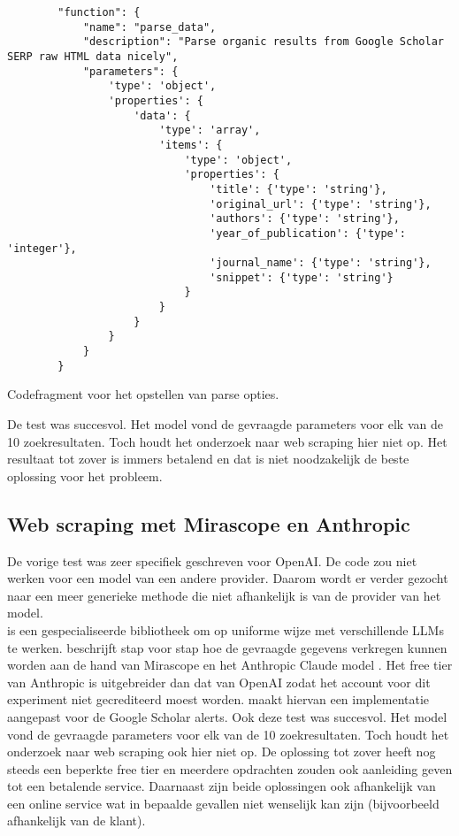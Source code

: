 \begin{listing}
    \begin{verbatim}
        "function": {
            "name": "parse_data",
            "description": "Parse organic results from Google Scholar SERP raw HTML data nicely",
            "parameters": {
                'type': 'object',
                'properties': {
                    'data': {
                        'type': 'array',
                        'items': {
                            'type': 'object',
                            'properties': {
                                'title': {'type': 'string'},
                                'original_url': {'type': 'string'},
                                'authors': {'type': 'string'},
                                'year_of_publication': {'type': 'integer'},
                                'journal_name': {'type': 'string'},
                                'snippet': {'type': 'string'}
                            }
                        }
                    }
                }
            }
        }
    \end{verbatim}
    \caption[Parse opties codefragment]{Codefragment voor het opstellen van parse opties.}
    \label{code:Parse opties codefragment}
\end{listing}
De test was succesvol. Het model vond de gevraagde parameters voor elk van de 10 zoekresultaten. Toch houdt het onderzoek naar web scraping hier niet op. Het resultaat tot zover is immers betalend en dat is niet noodzakelijk de beste oplossing voor het probleem.

\subsection{Web scraping met Mirascope en Anthropic}
De vorige test was zeer specifiek geschreven voor OpenAI. De code zou niet werken voor een model van een andere provider. Daarom wordt er verder gezocht naar een meer generieke methode die niet afhankelijk is van de provider van het model.\\
\textcite{Mirascope2025} is een gespecialiseerde bibliotheek om op uniforme wijze met verschillende LLMs te werken.
\textcite{Anthropic2025} beschrijft stap voor stap hoe de gevraagde gegevens verkregen kunnen worden aan de hand van Mirascope en het Anthropic Claude model \autocite{Anthropicmodel2025}. Het free tier van Anthropic is uitgebreider dan dat van OpenAI zodat het account voor dit experiment niet gecrediteerd moest worden.
\textcite{Depaepeanthropic2025} maakt hiervan een implementatie aangepast voor de Google Scholar alerts.
Ook deze test was succesvol. Het model vond de gevraagde parameters voor elk van de 10 zoekresultaten. Toch houdt het onderzoek naar web scraping ook hier niet op. De oplossing tot zover heeft nog steeds een beperkte free tier en meerdere opdrachten zouden ook aanleiding geven tot een betalende service.
Daarnaast zijn beide oplossingen ook afhankelijk van een online service wat in bepaalde gevallen niet wenselijk kan zijn (bijvoorbeeld afhankelijk van de klant).
